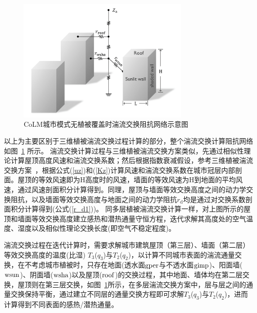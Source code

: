 {
  \begin{figure}[htbp]
    \centering
    \includegraphics[width=0.75\textwidth]{Figures/城市模式/CoLM城市模式无植被阻抗交换网络_v2.png}
    \caption{CoLM城市模式无植被覆盖时湍流交换阻抗网络示意图}
    \label{fig:无植被覆盖时城市湍流交换阻抗示意图}
  \end{figure}
}

以上为主要区别于三维植被湍流交换过程计算的部分，整个湍流交换计算阻抗网络如图~\ref{fig:无植被覆盖时城市湍流交换阻抗示意图} 所示。
湍流交换计算过程与三维植被湍流交换方案类似，先通过相似性理论计算屋顶高度风速和湍流交换系数；然后根据指数衰减假设，参考三维植被湍流交换方案~\citep{dai2019different}，根据公式(\ref{uz})和(\ref{Kz})计算风速和湍流交换系数在城市冠层内部剖面。屋顶的等效风速即为H高度时的风速，墙面的等效风速为H到地面的平均风速，通过风速剖面积分计算得到。同理，屋顶与墙面等效交换高度之间的动力学交换阻抗，以及墙面等效交换高度与地面之间的动力学阻抗$r_{\mathrm {d}}$均是通过对交换系数剖面积分计算得到(公式(\ref{r_d1}))。
同多层植被湍流交换计算一样，对上图所示的屋顶和墙面等效交换高度建立感热和潜热通量守恒方程，迭代求解其高度处的空气温度、湿度以及相似性理论交换长度(即空气不稳定程度)。

湍流交换过程在迭代计算时，需要求解城市建筑屋顶（第三层）、墙面（第二层）等效交换高度的温度(比湿) $T_3$($q_3$)与$T_2$($q_2$)，以计算不同城市表面的湍流通量交换，在不考虑城市植被时，只存在地面(透水面$\rm gper$与不透水面$\rm gimp$)、阳面墙($\rm wsun$)、阴面墙($\rm wsha$)以及屋顶($\rm roof$)的交换过程，其中地面、墙体均在第二层交换，屋顶则在第三层交换，如图~\ref{fig:无植被覆盖时城市湍流交换阻抗示意图}所示，在多层湍流交换方案中，层与层之间的通量交换保持平衡，通过建立不同层的通量交换方程即可求解$T_3$($q_3$)与$T_2$($q_2$)，进而计算得到不同表面的感热/潜热通量。

